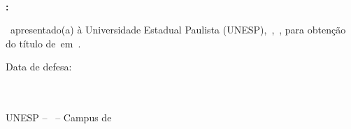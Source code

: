 	\begin{folhadeaprovacao}
		
		\begin{center}
			\normalsize{\textbf{\MakeUppercase\nomeDoAutor}}
			\\
			\vspace*{1cm}
			\normalsize{\textbf{\MakeUppercase\tituloDoTrabalho:}}
			\\
			\subtituloDoTrabalho
		\end{center}
		
		\vspace*{2cm}
		
		\noindent\tipoDeTrabalho\ apresentado(a) à Universidade Estadual Paulista (UNESP),\ \NomeDaFaculdade,\ \nomeDaCidade, para obtenção do título de\ \GrauAcademico{ }em\ \nomeDoCurso.
		\par
		\vspace*{1cm} 
		
		\vspace*{1cm} 
		
		\noindent Data de defesa: \dataDeDefesa
		\vspace*{1cm}
		
		
		\vspace*{1cm}
		
		\raggedright\makebox[2.5in]{\hrulefill}\\
		\tituloDoOrientador \nomeDoOrientador \\ UNESP -- \NomeDaFaculdade\ -- Campus de \nomeDaCidade
		
		\vspace*{1cm}
		
		\raggedright\makebox[2.5in]{\hrulefill}\\
		\tituloDoMembroA\ \nomeDoMembroA \\ \instituicaomembroA
		
		\vspace*{1cm}
		
		\raggedright\makebox[2.5in]{\hrulefill}\\
		\tituloDoMembroB\ \nomeDoMembroB \par \instituicaomembroB
		

\end{folhadeaprovacao}
